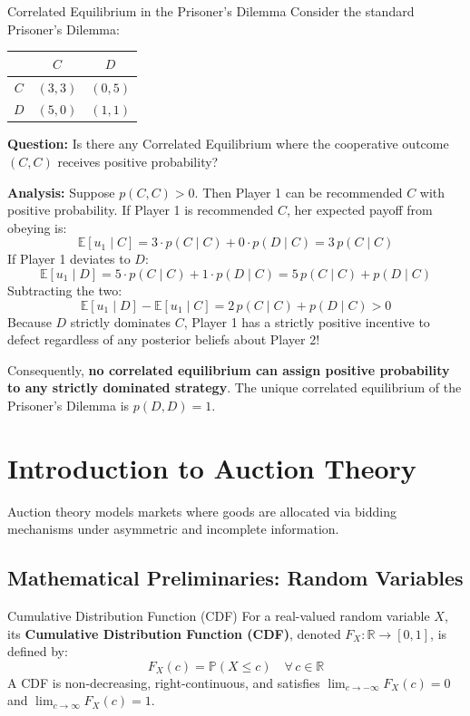 \documentclass[12pt, a4paper]{article}
\begin{document}
\begin{exbox}{Correlated Equilibrium in the Prisoner's Dilemma}
Consider the standard Prisoner's Dilemma:
\begin{center}
\renewcommand{\arraystretch}{1.2}
\begin{tabular}{c|cc}
 & $C$ & $D$ \\ \hline
$C$ & $(3, 3)$ & $(0, 5)$ \\
$D$ & $(5, 0)$ & $(1, 1)$
\end{tabular}
\end{center}
\textbf{Question:} Is there any Correlated Equilibrium where the cooperative outcome $(C, C)$ receives positive probability?

\textbf{Analysis:} Suppose $p(C, C) > 0$. Then Player 1 can be recommended $C$ with positive probability. If Player 1 is recommended $C$, her expected payoff from obeying is:
\[
  \mathbb{E}[u_1 \mid C] = 3 \cdot p(C \mid C) + 0 \cdot p(D \mid C) = 3 \, p(C \mid C)
\]
If Player 1 deviates to $D$:
\[
  \mathbb{E}[u_1 \mid D] = 5 \cdot p(C \mid C) + 1 \cdot p(D \mid C) = 5 \, p(C \mid C) + p(D \mid C)
\]
Subtracting the two:
\[
  \mathbb{E}[u_1 \mid D] - \mathbb{E}[u_1 \mid C] = 2 \, p(C \mid C) + p(D \mid C) > 0
\]
Because $D$ strictly dominates $C$, Player 1 has a strictly positive incentive to defect regardless of any posterior beliefs about Player 2! 

Consequently, \textbf{no correlated equilibrium can assign positive probability to any strictly dominated strategy}. The unique correlated equilibrium of the Prisoner's Dilemma is $p(D, D) = 1$.
\end{exbox}

\newpage
\section{Introduction to Auction Theory}

Auction theory models markets where goods are allocated via bidding mechanisms under asymmetric and incomplete information.

\subsection{Mathematical Preliminaries: Random Variables}

\begin{defbox}{Cumulative Distribution Function (CDF)}
For a real-valued random variable $X$, its \textbf{Cumulative Distribution Function (CDF)}, denoted $F_X : \mathbb{R} \to [0, 1]$, is defined by:
\[
  F_X(c) = \mathbb{P}(X \leq c) \quad \forall\, c \in \mathbb{R}
\]
A CDF is non-decreasing, right-continuous, and satisfies $\lim_{c \to -\infty} F_X(c) = 0$ and $\lim_{c \to \infty} F_X(c) = 1$.
\end{defbox}
\end{document}
